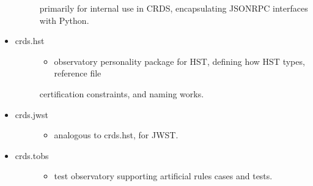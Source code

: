 \documentclass[letterpaper,10pt,english]{sphinxmanual}
\begin{document}
\begin{itemize}
\begin{description}
primarily for internal use in CRDS,  encapsulating JSONRPC interfaces with Python.

\end{description}

\item {} \begin{description}
\item[{crds.hst}] \leavevmode\begin{itemize}
\item {} 
observatory personality package for HST, defining how HST types, reference file

\end{itemize}

certification constraints, and naming works.

\end{description}

\item {} \begin{description}
\item[{crds.jwst}] \leavevmode\begin{itemize}
\item {} 
analogous to crds.hst,  for JWST.

\end{itemize}

\end{description}

\item {} \begin{description}
\item[{crds.tobs}] \leavevmode\begin{itemize}
\item {} 
test observatory supporting artificial rules cases and tests.

\end{itemize}

\end{description}

\end{itemize}
\end{document}
